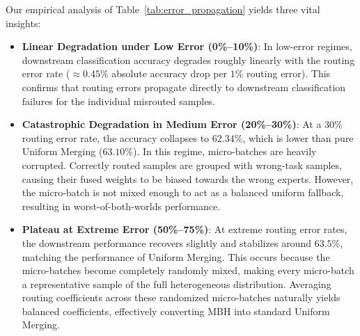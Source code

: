 \documentclass{article}
\theoremstyle{plain}
\theoremstyle{definition}
\theoremstyle{remark}
\begin{document}
Our empirical analysis of Table~\ref{tab:error_propagation} yields three vital insights:
\begin{itemize}
    \item \textbf{Linear Degradation under Low Error (0\%--10\%)}: In low-error regimes, downstream classification accuracy degrades roughly linearly with the routing error rate ($\approx 0.45\%$ absolute accuracy drop per $1\%$ routing error). This confirms that routing errors propagate directly to downstream classification failures for the individual misrouted samples.
    \item \textbf{Catastrophic Degradation in Medium Error (20\%--30\%)}: At a $30\%$ routing error rate, the accuracy collapses to $62.34\%$, which is lower than pure Uniform Merging ($63.10\%$). In this regime, micro-batches are heavily corrupted. Correctly routed samples are grouped with wrong-task samples, causing their fused weights to be biased towards the wrong experts. However, the micro-batch is not mixed enough to act as a balanced uniform fallback, resulting in worst-of-both-worlds performance.
    \item \textbf{Plateau at Extreme Error (50\%--75\%)}: At extreme routing error rates, the downstream performance recovers slightly and stabilizes around $63.5\%$, matching the performance of Uniform Merging. This occurs because the micro-batches become completely randomly mixed, making every micro-batch a representative sample of the full heterogeneous distribution. Averaging routing coefficients across these randomized micro-batches naturally yields balanced coefficients, effectively converting MBH into standard Uniform Merging.
\end{itemize}
\end{document}

